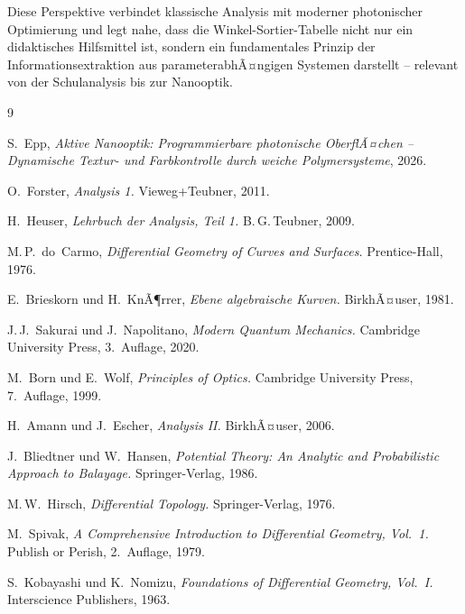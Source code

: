 ﻿\documentclass[12pt, a4paper]{article}
\theoremstyle{definition}
\begin{document}
	Diese Perspektive verbindet klassische Analysis mit moderner photonischer
	Optimierung und legt nahe, dass die Winkel-Sortier-Tabelle nicht nur ein
	didaktisches Hilfsmittel ist, sondern ein fundamentales Prinzip der
	Informationsextraktion aus parameterabhÃ¤ngigen Systemen darstellt -- relevant
	von der Schulanalysis bis zur Nanooptik.
	
	\begin{thebibliography}{9}
		
		S.~Epp,
		\newblock \emph{Aktive Nanooptik: Programmierbare photonische OberflÃ¤chen --
			Dynamische Textur- und Farbkontrolle durch weiche Polymersysteme}, 2026.
		
		O.~Forster,
		\newblock \emph{Analysis 1.}
		\newblock Vieweg+Teubner, 2011.
		
		H.~Heuser,
		\newblock \emph{Lehrbuch der Analysis, Teil 1.}
		\newblock B.\,G.\,Teubner, 2009.
		
		M.\,P.~do~Carmo,
		\newblock \emph{Differential Geometry of Curves and Surfaces.}
		\newblock Prentice-Hall, 1976.
		
		E.~Brieskorn und H.~KnÃ¶rrer,
		\newblock \emph{Ebene algebraische Kurven.}
		\newblock BirkhÃ¤user, 1981.
		
		J.\,J.~Sakurai und J.~Napolitano,
		\newblock \emph{Modern Quantum Mechanics.}
		\newblock Cambridge University Press, 3.~Auflage, 2020.
		
		M.~Born und E.~Wolf,
		\newblock \emph{Principles of Optics.}
		\newblock Cambridge University Press, 7.~Auflage, 1999.
		
		H.~Amann und J.~Escher,
		\newblock \emph{Analysis II.}
		\newblock BirkhÃ¤user, 2006.
		
		J.~Bliedtner und W.~Hansen,
		\newblock \emph{Potential Theory: An Analytic and Probabilistic Approach to Balayage.}
		\newblock Springer-Verlag, 1986.
		
		M.\,W.~Hirsch,
		\newblock \emph{Differential Topology.}
		\newblock Springer-Verlag, 1976.
		
		M.~Spivak,
		\newblock \emph{A Comprehensive Introduction to Differential Geometry, Vol.~1.}
		\newblock Publish or Perish, 2.~Auflage, 1979.
		
		S.~Kobayashi und K.~Nomizu,
		\newblock \emph{Foundations of Differential Geometry, Vol.~I.}
		\newblock Interscience Publishers, 1963.
		

\end{thebibliography}
\end{document}
